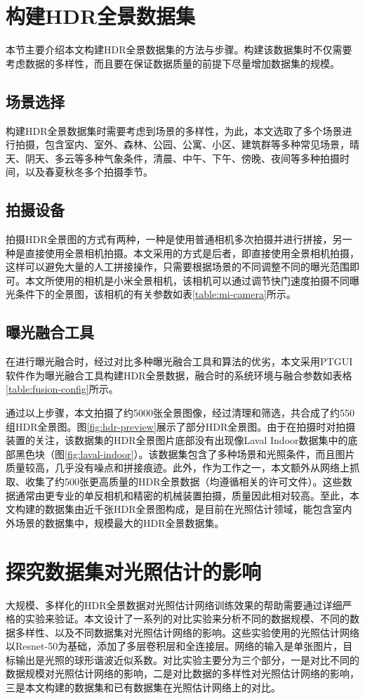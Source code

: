 \section{构建HDR全景数据集}

本节主要介绍本文构建HDR全景数据集的方法与步骤。构建该数据集时不仅需要考虑数据的多样性，而且要在保证数据质量的前提下尽量增加数据集的规模。
\subsection{场景选择}
构建HDR全景数据集时需要考虑到场景的多样性，为此，本文选取了多个场景进行拍摄，包含室内、室外、森林、公园、公寓、小区、建筑群等多种常见场景，晴天、阴天、多云等多种气象条件，清晨、中午、下午、傍晚、夜间等多种拍摄时间，以及春夏秋冬多个拍摄季节。
\subsection{拍摄设备}
拍摄HDR全景图的方式有两种，一种是使用普通相机多次拍摄并进行拼接，另一种是直接使用全景相机拍摄。本文采用的方式是后者，即直接使用全景相机拍摄，这样可以避免大量的人工拼接操作，只需要根据场景的不同调整不同的曝光范围即可。本文所使用的相机是小米全景相机\cite{xiaomi}，该相机可以通过调节快门速度拍摄不同曝光条件下的全景图，该相机的有关参数如表\ref{table:mi-camera}所示。
\subsection{曝光融合工具}
在进行曝光融合时，经过对比多种曝光融合工具和算法的优劣，本文采用PTGUI软件\cite{ptgui}作为曝光融合工具构建HDR全景数据，融合时的系统环境与融合参数如表格\ref{table:fusion-config}所示。


通过以上步骤，本文拍摄了约5000张全景图像，经过清理和筛选，共合成了约550组HDR全景图。图\ref{fig:hdr-preview}展示了部分HDR全景图。由于在拍摄时对拍摄装置的关注，该数据集的HDR全景图片底部没有出现像Laval Indoor数据集\cite{gardner2017learning}中的底部黑色块（图\ref{fig:laval-indoor}）。该数据集包含了多种场景和光照条件，而且图片质量较高，几乎没有噪点和拼接痕迹。此外，作为工作之一，本文额外从网络上抓取、收集了约500张更高质量的HDR全景数据（均遵循相关的许可文件）。这些数据通常由更专业的单反相机和精密的机械装置拍摄，质量因此相对较高。至此，本文构建的数据集由近千张HDR全景图构成，是目前在光照估计领域，能包含室内外场景的数据集中，规模最大的HDR全景数据集。
\section{探究数据集对光照估计的影响}
大规模、多样化的HDR全景数据对光照估计网络训练效果的帮助需要通过详细严格的实验来验证。本文设计了一系列的对比实验来分析不同的数据规模、不同的数据多样性、以及不同数据集对光照估计网络的影响。这些实验使用的光照估计网络以Resnet-50\cite{he2016deep}为基础，添加了多层卷积层和全连接层。网络的输入是单张图片，目标输出是光照的球形谐波近似系数。对比实验主要分为三个部分，一是对比不同的数据规模对光照估计网络的影响，二是对比数据的多样性对光照估计网络的影响，三是本文构建的数据集和已有数据集在光照估计网络上的对比。

